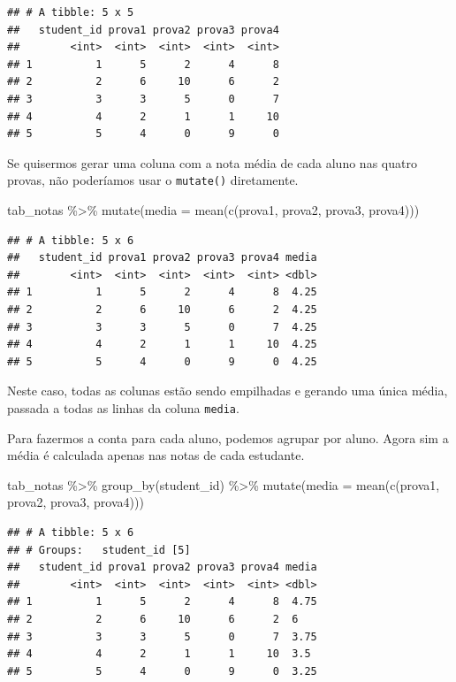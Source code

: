 \documentclass[
]{book}
\newenvironment{Shaded}{\begin{snugshade}}{\end{snugshade}}
\newcommand{\AttributeTok}[1]{\textcolor[rgb]{0.77,0.63,0.00}{#1}}
\newcommand{\FunctionTok}[1]{\textcolor[rgb]{0.00,0.00,0.00}{#1}}
\newcommand{\NormalTok}[1]{#1}
\newcommand{\SpecialCharTok}[1]{\textcolor[rgb]{0.00,0.00,0.00}{#1}}
\begin{document}
\begin{verbatim}
## # A tibble: 5 x 5
##   student_id prova1 prova2 prova3 prova4
##        <int>  <int>  <int>  <int>  <int>
## 1          1      5      2      4      8
## 2          2      6     10      6      2
## 3          3      3      5      0      7
## 4          4      2      1      1     10
## 5          5      4      0      9      0
\end{verbatim}

Se quisermos gerar uma coluna com a nota média de cada aluno nas quatro provas, não poderíamos usar o \texttt{mutate()} diretamente.

\begin{Shaded}
\begin{Highlighting}[]
\NormalTok{tab\_notas }\SpecialCharTok{\%\textgreater{}\%} \FunctionTok{mutate}\NormalTok{(}\AttributeTok{media =} \FunctionTok{mean}\NormalTok{(}\FunctionTok{c}\NormalTok{(prova1, prova2, prova3, prova4)))}
\end{Highlighting}
\end{Shaded}

\begin{verbatim}
## # A tibble: 5 x 6
##   student_id prova1 prova2 prova3 prova4 media
##        <int>  <int>  <int>  <int>  <int> <dbl>
## 1          1      5      2      4      8  4.25
## 2          2      6     10      6      2  4.25
## 3          3      3      5      0      7  4.25
## 4          4      2      1      1     10  4.25
## 5          5      4      0      9      0  4.25
\end{verbatim}

Neste caso, todas as colunas estão sendo empilhadas e gerando uma única média, passada a todas as linhas da coluna \texttt{media}.

Para fazermos a conta para cada aluno, podemos agrupar por aluno. Agora sim a média é calculada apenas nas notas de cada estudante.

\begin{Shaded}
\begin{Highlighting}[]
\NormalTok{tab\_notas }\SpecialCharTok{\%\textgreater{}\%}
  \FunctionTok{group\_by}\NormalTok{(student\_id) }\SpecialCharTok{\%\textgreater{}\%}
  \FunctionTok{mutate}\NormalTok{(}\AttributeTok{media =} \FunctionTok{mean}\NormalTok{(}\FunctionTok{c}\NormalTok{(prova1, prova2, prova3, prova4)))}
\end{Highlighting}
\end{Shaded}

\begin{verbatim}
## # A tibble: 5 x 6
## # Groups:   student_id [5]
##   student_id prova1 prova2 prova3 prova4 media
##        <int>  <int>  <int>  <int>  <int> <dbl>
## 1          1      5      2      4      8  4.75
## 2          2      6     10      6      2  6   
## 3          3      3      5      0      7  3.75
## 4          4      2      1      1     10  3.5 
## 5          5      4      0      9      0  3.25
\end{verbatim}
\end{document}
